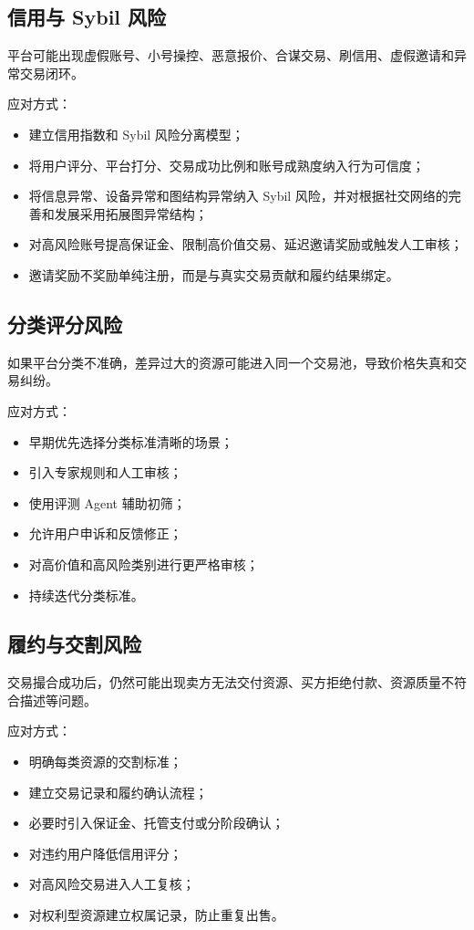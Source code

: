 \documentclass[UTF8,a4paper,12pt]{ctexart}
\begin{document}
\subsection{信用与 Sybil 风险}

平台可能出现虚假账号、小号操控、恶意报价、合谋交易、刷信用、虚假邀请和异常交易闭环。

应对方式：

\begin{itemize}
    \item 建立信用指数和 Sybil 风险分离模型；
    \item 将用户评分、平台打分、交易成功比例和账号成熟度纳入行为可信度；
    \item 将信息异常、设备异常和图结构异常纳入 Sybil 风险，并对根据社交网络的完善和发展采用拓展图异常结构；
    \item 对高风险账号提高保证金、限制高价值交易、延迟邀请奖励或触发人工审核；
    \item 邀请奖励不奖励单纯注册，而是与真实交易贡献和履约结果绑定。
\end{itemize}

\subsection{分类评分风险}

如果平台分类不准确，差异过大的资源可能进入同一个交易池，导致价格失真和交易纠纷。

应对方式：

\begin{itemize}
    \item 早期优先选择分类标准清晰的场景；
    \item 引入专家规则和人工审核；
    \item 使用评测 Agent 辅助初筛；
    \item 允许用户申诉和反馈修正；
    \item 对高价值和高风险类别进行更严格审核；
    \item 持续迭代分类标准。
\end{itemize}

\subsection{履约与交割风险}

交易撮合成功后，仍然可能出现卖方无法交付资源、买方拒绝付款、资源质量不符合描述等问题。

应对方式：

\begin{itemize}
    \item 明确每类资源的交割标准；
    \item 建立交易记录和履约确认流程；
    \item 必要时引入保证金、托管支付或分阶段确认；
    \item 对违约用户降低信用评分；
    \item 对高风险交易进入人工复核；
    \item 对权利型资源建立权属记录，防止重复出售。
\end{itemize}
\end{document}
